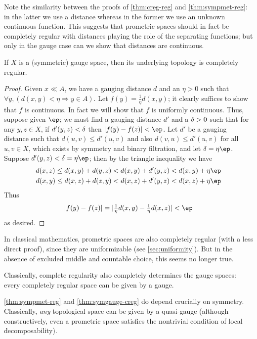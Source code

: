 \documentclass{article}
\let\implies\Rightarrow
\begin{document}
Note the similarity between the proofs of \cref{thm:creg-reg} and \cref{thm:sympmet-reg}: in the latter we use a distance whereas in the former we use an unknown continuous function.
This suggests that prometric spaces should in fact be completely regular with distances playing the role of the separating functions; but only in the gauge case can we show that distances are continuous.

\begin{thm}\label{thm:symgauge-creg}
  If $X$ is a (symmetric) gauge space, then its underlying topology is completely regular.
\end{thm}
\begin{proof}
  Given $x\ll A$, we have a gauging distance $d$ and an $\eta>0$ such that $\forall y, (d(x,y)<\eta \implies y\in A)$.
  Let $f(y) = \frac1{\eta} d(x,y)$; it clearly suffices to show that $f$ is continuous.
  In fact we will show that $f$ is uniformly continuous.
  Thus, suppose given $\ep$; we must find a gauging distance $d'$ and a $\delta>0$ such that for any $y,z\in X$, if $d'(y,z)<\delta$ then $|f(y)-f(z)|<\ep$.
  Let $d'$ be a gauging distance such that $d(u,v)\le d'(u,v)$ and also $d(v,u) \le d'(u,v)$ for all $u,v\in X$, which exists by symmetry and binary filtration, and let $\de = \eta\ep$.
  Suppose $d'(y,z)< \de= \eta\ep$; then by the triangle inequality we have
  \begin{gather*}
    d(x,z) \le d(x,y)+d(y,z) < d(x,y) + d'(y,z) < d(x,y)+\eta\ep\\
    d(x,y) \le d(x,z)+d(z,y) < d(x,z) + d'(y,z) < d(x,z)+\eta\ep
  \end{gather*}
  Thus
  \[ |f(y)-f(z)| = |\textstyle\frac1{\eta}d(x,y) - \frac1{\eta}d(x,z)| < \ep \]
  as desired.
\end{proof}

In classical mathematics, prometric spaces are also completely regular (with a less direct proof), since they are uniformizable (see \cref{sec:uniformity}).
But in the absence of excluded middle and countable choice, this seems no longer true.

Classically, complete regularity also completely determines the gauge spaces: every completely regular space can be given by a gauge.

\cref{thm:sympmet-reg} and \cref{thm:symgauge-creg} do depend crucially on symmetry.
Classically, \emph{any} topological space can be given by a quasi-gauge (although constructively, even a prometric space satisfies the nontrivial condition of local decomposability).
\end{document}
